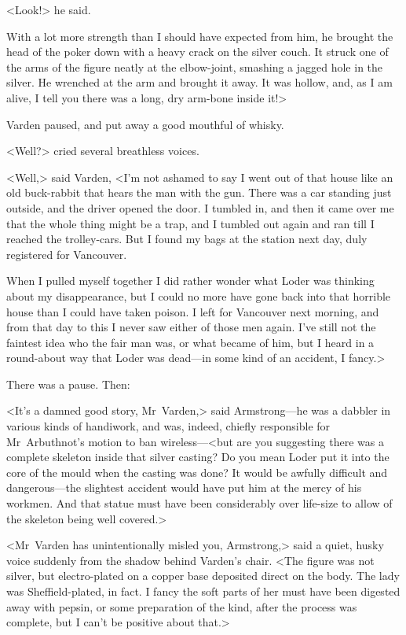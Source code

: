 <Look!> he said.

With a lot more strength than I should have expected from him, he brought the head of the poker down with a heavy crack on the silver couch. It struck one of the arms of the figure neatly at the elbow-joint, smashing a jagged hole in the silver. He wrenched at the arm and brought it away. It was hollow, and, as I am alive, I tell you there was a long, dry arm-bone inside it!>

Varden paused, and put away a good mouthful of whisky.

<Well?> cried several breathless voices.

<Well,> said Varden, <I'm not ashamed to say I went out of that house like an old buck-rabbit that hears the man with the gun. There was a car standing just outside, and the driver opened the door. I tumbled in, and then it came over me that the whole thing might be a trap, and I tumbled out again and ran till I reached the trolley-cars. But I found my bags at the station next day, duly registered for Vancouver.

When I pulled myself together I did rather wonder what Loder was thinking about my disappearance, but I could no more have gone back into that horrible house than I could have taken poison. I left for Vancouver next morning, and from that day to this I never saw either of those men again. I've still not the faintest idea who the fair man was, or what became of him, but I heard in a round-about way that Loder was dead—in some kind of an accident, I fancy.>

There was a pause. Then:

<It's a damned good story, Mr~Varden,> said Armstrong—he was a dabbler in various kinds of handiwork, and was, indeed, chiefly responsible for Mr~Arbuthnot's motion to ban wireless—<but are you suggesting there was a complete skeleton inside that silver casting? Do you mean Loder put it into the core of the mould when the casting was done? It would be awfully difficult and dangerous—the slightest accident would have put him at the mercy of his workmen. And that statue must have been considerably over life-size to allow of the skeleton being well covered.>

<Mr~Varden has unintentionally misled you, Armstrong,> said a quiet, husky voice suddenly from the shadow behind Varden's chair. <The figure was not silver, but electro-plated on a copper base deposited direct on the body. The lady was Sheffield-plated, in fact. I fancy the soft parts of her must have been digested away with pepsin, or some preparation of the kind, after the process was complete, but I can't be positive about that.>

